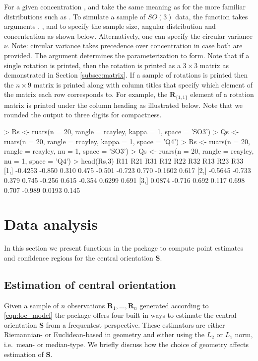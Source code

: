 For a given concentration ,  and  take the same meaning as for the more familiar distributions such as .  To simulate a sample of $SO(3)$ data, the  function takes arguments , , and  to specify the sample size, angular distribution and concentration as shown below.  Alternatively, one can specify the circular variance $\nu$.  Note: circular variance takes precedence over  concentration in case both are provided.  The  argument determines the parameterization to form.   Note that if a single rotation is printed, then the rotation is printed as a $3\times3$ matrix as demonstrated in Section \ref{subsec:matrix}. If a sample of rotations is printed then the $n\times 9$ matrix is printed along with column titles that specify which element of the matrix each row corresponds to.  For example, the $\bm R_{\{1,1\}}$ element of a rotation matrix is printed under the column heading  as illustrated below.   Note that we rounded the output to three digits for compactness.

\begin{example}
> Rs <- ruars(n = 20, rangle = rcayley, kappa = 1, space = 'SO3')
> Qs <- ruars(n = 20, rangle = rcayley, kappa = 1, space = 'Q4')
> Rs <- ruars(n = 20, rangle = rcayley, nu = 1, space = 'SO3')
> Qs <- ruars(n = 20, rangle = rcayley, nu = 1, space = 'Q4')
> head(Rs,3)
         R11    R21   R31   R12    R22    R32    R13     R23   R33
[1,] -0.4253 -0.850 0.310 0.475 -0.501 -0.723  0.770 -0.1602 0.617
[2,] -0.5645 -0.733 0.379 0.745 -0.256  0.615 -0.354  0.6299 0.691
[3,]  0.0874 -0.716 0.692 0.117  0.698  0.707 -0.989  0.0193 0.145
\end{example}

\section{Data analysis\label{section:analysis}}

In this section we present functions in the  package to compute point estimates and confidence regions for the central orientation $\bm S$.

\subsection{Estimation of central orientation}

Given a sample of $n$ observations $\bm R_1,\dots,\bm R_{n}$ generated according to \eqref{eqn:loc_model} the  package offers four  built-in ways to estimate the central orientation $\bm S$ from a frequentest perspective.  These estimators are either Riemannian- or Euclidean-based in geometry and either using the $L_2$ or $L_1$ norm, i.e.~mean- or median-type.  We briefly discuss how the choice of geometry affects estimation of $\bm S$.

